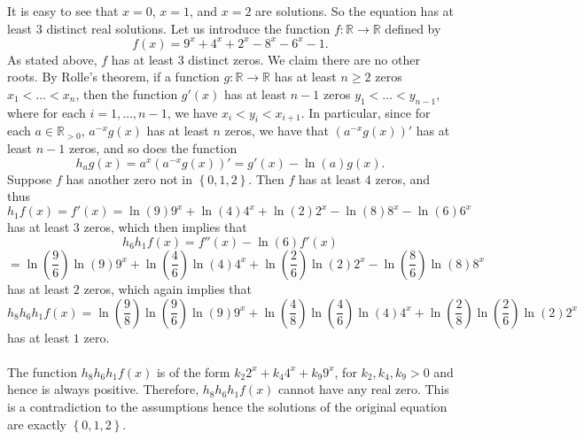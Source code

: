 \begin{solution}
    It is easy to see that \( x = 0 \), \( x = 1 \), and \( x = 2 \) are solutions. So the equation has at least \( 3 \) distinct real solutions. Let us introduce the function \( f: \mathbb{R} \rightarrow \mathbb{R} \) defined by
    \[
        f\left(x\right) = 9^{x} + 4^{x} + 2^{x} - 8^{x} - 6^{x} - 1.
    \]
    As stated above, \( f \) has at least \( 3 \) distinct zeros. We claim there are no other roots. By Rolle's theorem, if a function \( g: \mathbb{R} \rightarrow \mathbb{R} \) has at least \( n \geq 2 \) zeros \( x_1 < \dots < x_n \), then the function \( g'\left(x\right) \) has at least \( n - 1 \) zeros \( y_1 < \dots < y_{n-1} \), where for each \( i = 1, \dots, n-1 \), we have \( x_i < y_i < x_{i+1} \). In particular, since for each \( a \in \mathbb{R}_{>0} \), \( a^{-x} g\left(x\right) \) has at least \( n \) zeros, we have that \( \left( a^{-x} g\left(x\right) \right)' \) has at least \( n - 1 \) zeros, and so does the function
    \[
        h_{a} g\left(x\right) = a^x \left( a^{-x} g\left(x\right) \right)' = g'\left(x\right) - \ln\left(a\right) g\left(x\right).
    \]
    Suppose \( f \) has another zero not in \( \left\{0, 1, 2\right\} \). Then \( f \) has at least \( 4 \) zeros, and thus
    \[
        h_{1} f\left(x\right) = f'\left(x\right) = \ln\left(9\right) 9^x + \ln\left(4\right) 4^x + \ln\left(2\right) 2^x - \ln\left(8\right) 8^x - \ln\left(6\right) 6^x
    \]
    has at least \( 3 \) zeros, which then implies that
    \[
        h_{6} h_{1} f\left(x\right) = f''\left(x\right) - \ln\left(6\right) f'\left(x\right)
    \]
    \[
        = \ln\left( \frac{9}{6} \right) \ln\left(9\right) 9^x + \ln\left( \frac{4}{6} \right) \ln\left(4\right) 4^x + \ln\left( \frac{2}{6} \right) \ln\left(2\right) 2^x - \ln\left( \frac{8}{6} \right) \ln\left(8\right) 8^x
    \]
    has at least \( 2 \) zeros, which again implies that
    \[
        h_{8} h_{6} h_{1} f\left(x\right) = \ln\left( \frac{9}{8} \right) \ln\left( \frac{9}{6} \right) \ln\left(9\right) 9^x + \ln\left( \frac{4}{8} \right) \ln\left( \frac{4}{6} \right) \ln\left(4\right) 4^x + \ln\left( \frac{2}{8} \right) \ln\left( \frac{2}{6} \right) \ln\left(2\right) 2^x
    \]
    has at least \( 1 \) zero.
    \\\\
    The function \( h_{8} h_{6} h_{1} f\left(x\right) \) is of the form \( k_{2} 2^x + k_{4} 4^x + k_{9} 9^x \), for \( k_2, k_4, k_9>0 \) and hence is always positive. Therefore, \( h_{8} h_{6} h_{1} f\left(x\right) \) cannot have any real zero. This is a contradiction to the assumptions hence the solutions of the original equation are exactly \( \left\{0, 1, 2\right\} \).
\end{solution}
